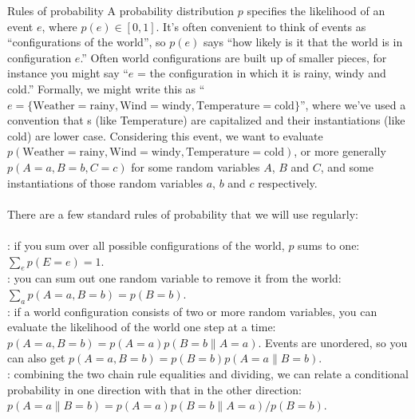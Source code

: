 \begin{mathreview}{Rules of probability}
  A probability distribution $p$ specifies the likelihood of an event $e$, where $p(e) \in [0,1]$.
  It's often convenient to think of events as ``configurations of the world'', so $p(e)$ says ``how likely is it that the world is in configuration $e$.''
  Often world configurations are built up of smaller pieces, for instance you might say ``$e$ = the configuration in which it is rainy, windy and cold.''
  Formally, we might write this as ``$e = \{ \text{Weather}=\text{rainy}, \text{Wind}=\text{windy}, \text{Temperature}=\text{cold} \}$'', where we've used a convention that s (like Temperature) are capitalized and their instantiations (like cold) are lower case.
  Considering this event, we want to evaluate $p(\text{Weather}=\text{rainy}, \text{Wind}=\text{windy}, \text{Temperature}=\text{cold})$, or more generally $p(A=a, B=b, C=c)$ for some random variables $A$, $B$ and $C$, and some instantiations of those random variables $a$, $b$ and $c$ respectively.
  ~\\~\\
  There are a few standard rules of probability that we will use regularly:
  ~\\~\\
  : if you sum over all possible configurations of the world, $p$ sums to one: $\sum_e p(E=e) = 1$.\\
  : you can sum out one random variable to remove it from the world: $\sum_a p(A=a, B=b) = p(B=b)$.\\
  : if a world configuration consists of two or more random variables, you can evaluate the likelihood of the world one step at a time: $p(A=a, B=b) = p(A=a) p(B=b \| A=a)$. Events are unordered, so you can also get $p(A=a, B=b) = p(B=b) p(A=a \| B=b)$.\\
  : combining the two chain rule equalities and dividing, we can relate a conditional probability in one direction with that in the other direction: $p(A=a \| B=b) = p(A=a) p(B=b \| A=a) / p(B=b)$.
\end{mathreview}


